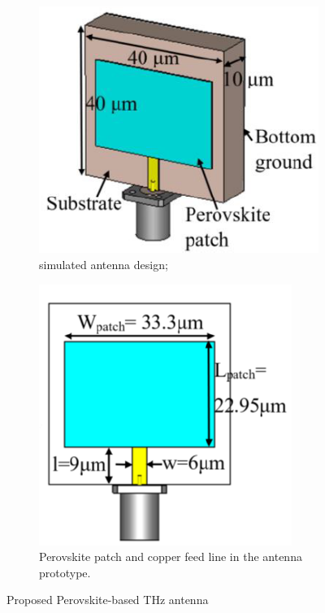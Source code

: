 \documentclass[12pt]{suhbook}
\begin{document}
\begin{figure}[hbt!]
\begin{subfigure}{.5\textwidth}
\centering
\includegraphics[width=.9\linewidth]{15}
\caption{simulated antenna design;}
\label{fig:sfig11a}
\end{subfigure}%
\begin{subfigure}{.4\textwidth}
  \centering
  \includegraphics[width=.9\linewidth]{16}
  \caption{Perovskite patch and copper feed line in the antenna prototype.}
  \label{fig:sfigb11}
\end{subfigure}
\caption{Proposed Perovskite-based THz antenna}
\label{fig:fig 11b}
\end{figure}
\end{document}
